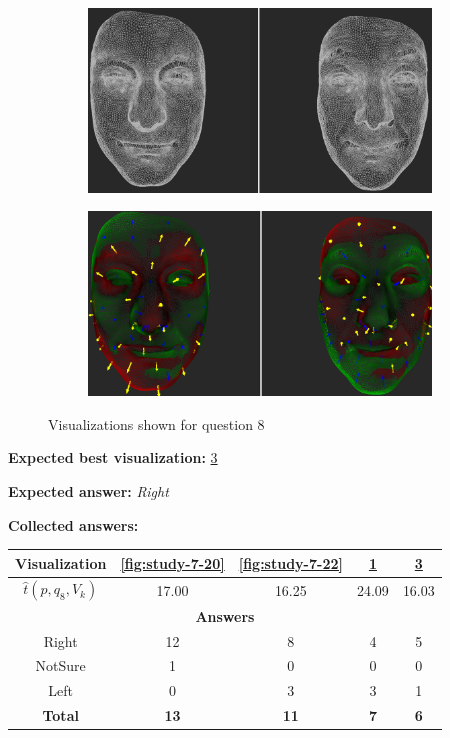 \begin{figure}[h]
\begin{subfigure}{0.49\textwidth}
\includegraphics[width=\textwidth]{./img-study/pair19.PNG}
\caption{}
\label{fig:study-7-19}
\end{subfigure}
\begin{subfigure}{0.49\textwidth}
\includegraphics[width=\textwidth]{./img-study/pair21.PNG}
\caption{}
\label{fig:study-7-21}
\end{subfigure}
\caption{Visualizations shown for question 8}
\end{figure}
\medskip

{\bf Expected best visualization:} \ref{fig:study-7-21}
\medskip

{\bf Expected answer:} {\it Right}
\medskip

{\bf Collected answers:}

\begin{center}
\begin{tabular}{| c | c | c | c | c |}
	\hline
	Visualization & \ref{fig:study-7-20} & \ref{fig:study-7-22} & \ref{fig:study-7-19} & \ref{fig:study-7-21}\\ \hline
	\(\widehat{t}(p, q_8, V_k)\) & 17.00 & 16.25 & 24.09 & 16.03\\ \hline
	\multicolumn{5}{|c|}{\bf Answers} \\ \hline
	\rowcolor{yellow!30} Right & 12 & 8 & 4 & 5\\ \hline
	NotSure & 1 & 0 & 0 & 0\\ \hline
	Left & 0 & 3 & 3 & 1\\ \hline
	{\bf Total} & {\bf 13} & {\bf 11} & {\bf 7} & {\bf 6}\\ \hline
\end{tabular}
\end{center}
\clearpage

